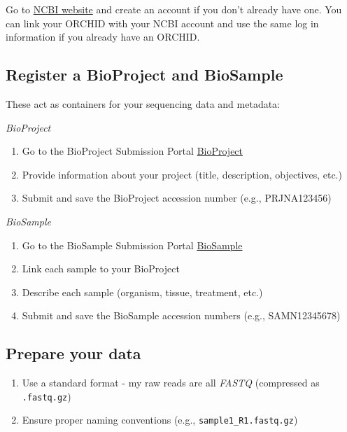 \documentclass[
]{article}
\begin{document}
Go to \href{https://www.ncbi.nlm.nih.gov/}{NCBI website} and create an
account if you don't already have one. You can link your ORCHID with
your NCBI account and use the same log in information if you already
have an ORCHID.

\hypertarget{register-a-bioproject-and-biosample}{%
\subsection{Register a BioProject and
BioSample}\label{register-a-bioproject-and-biosample}}

These act as containers for your sequencing data and metadata:

\emph{BioProject}

\begin{enumerate}
\def\labelenumi{\arabic{enumi}.}
\item
  Go to the BioProject Submission Portal
  \href{https://submit.ncbi.nlm.nih.gov/subs/bioproject/}{BioProject}
\item
  Provide information about your project (title, description,
  objectives, etc.)
\item
  Submit and save the BioProject accession number (e.g., PRJNA123456)
\end{enumerate}

\emph{BioSample}

\begin{enumerate}
\def\labelenumi{\arabic{enumi}.}
\item
  Go to the BioSample Submission Portal
  \href{https://submit.ncbi.nlm.nih.gov/subs/biosample/}{BioSample}
\item
  Link each sample to your BioProject
\item
  Describe each sample (organism, tissue, treatment, etc.)
\item
  Submit and save the BioSample accession numbers (e.g., SAMN12345678)
\end{enumerate}

\hypertarget{prepare-your-data}{%
\subsection{Prepare your data}\label{prepare-your-data}}

\begin{enumerate}
\def\labelenumi{\arabic{enumi}.}
\item
  Use a standard format - my raw reads are all \emph{FASTQ} (compressed
  as \texttt{.fastq.gz})
\item
  Ensure proper naming conventions (e.g., \texttt{sample1\_R1.fastq.gz})
\end{enumerate}
\end{document}
